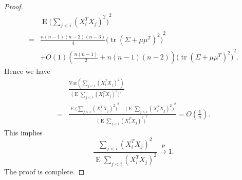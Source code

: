 \documentclass[review]{elsarticle}
\DeclareMathOperator{\mytr}{tr}
\DeclareMathOperator{\myE}{E}
\theoremstyle{plain}
\theoremstyle{definition}
\theoremstyle{remark}
\begin{document}
\begin{proof}
\begin{equation*}
    \begin{aligned}
        &\myE{\big(\sum_{j<i}{(X_i^T X_j)}^2\big)}^2\\
            =&\frac{n(n-1)(n-2)(n-3)}{4}{\big(\mytr (\Sigma+\mu\mu^T)^2\big)}^2\\
            &+O(1)(\frac{n(n-1)}{2}+n(n-1)(n-2)){\big(\mytr (\Sigma+\mu\mu^T)^2\big)}^2.
    \end{aligned}
    \end{equation*}
Hence we have
    \begin{equation*}
    \begin{aligned}
        &\frac{
        \mathrm{Var}(\sum_{j<i}{(X_i^T X_j)}^2)
    }{\big(\myE\sum_{j<i}{(X_i^T X_j)}^2\big)^2}\\
        =&
    \frac{
        \myE{\big(\sum_{j<i}{(X_i^T X_j)}^2\big)}^2-
        {\big(\myE\sum_{j<i}{(X_i^T X_j)}^2\big)}^2
    }{
        {\big(\myE\sum_{j<i}{(X_i^T X_j)}^2\big)}^2
    }
    =O(\frac{1}{n}).
    \end{aligned}
    \end{equation*}
    This implies 
        \begin{equation*}
        \frac{
        \sum_{j<i}{(X_i^T X_j)}^2
    }{\myE\sum_{j<i}{(X_i^T X_j)}^2}\xrightarrow{P}1.
        \end{equation*}
    The proof is complete.
\end{proof}
\end{document}
